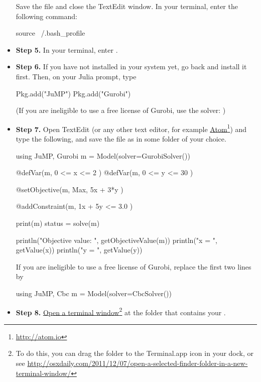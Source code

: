 \begin{itemize}

Save the file and close the TextEdit window. In your terminal, enter the following command:

\begin{code}
source ~/.bash_profile
\end{code}


\item \textbf{Step 5.} In your terminal, enter .



\item \textbf{Step 6.} If you have not installed \gurobi{} in your system yet, go back and install it first. Then, on your Julia prompt, type
\begin{code}
Pkg.add("JuMP")
Pkg.add("Gurobi")
\end{code}

(If you are ineligible to use a free license of Gurobi, use the  solver: )



\item \textbf{Step 7.} Open TextEdit (or any other text editor, for example \href{http://atom.io}{Atom}\footnote{\url{http://atom.io}}) and type the following, and save the file as  in some folder of your choice.

\begin{code}
using JuMP, Gurobi
m = Model(solver=GurobiSolver())

@defVar(m, 0 <= x <= 2 )
@defVar(m, 0 <= y <= 30 )

@setObjective(m, Max, 5x + 3*y )

@addConstraint(m, 1x + 5y <= 3.0 )

print(m)
status = solve(m)

println("Objective value: ", getObjectiveValue(m))
println("x = ", getValue(x))
println("y = ", getValue(y))
\end{code}

If you are ineligible to use a free license of Gurobi, replace the first two lines by
\begin{code}
using JuMP, Cbc
m = Model(solver=CbcSolver())
\end{code}


\item \textbf{Step 8.} \href{http://osxdaily.com/2011/12/07/open-a-selected-finder-folder-in-a-new-terminal-window/}{Open a terminal window}\footnote{To do this, you can drag the folder to the Terminal.app icon in your dock, or see \url{http://osxdaily.com/2011/12/07/open-a-selected-finder-folder-in-a-new-terminal-window/}} at the folder that contains your .


\end{itemize}
